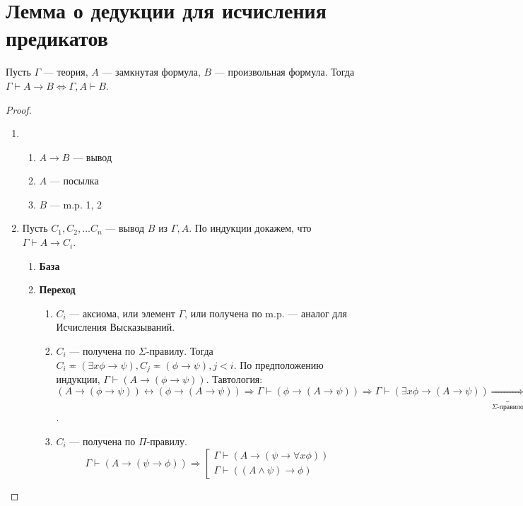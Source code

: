 \section{Лемма о дедукции для исчисления предикатов}
\begin{lemma}[О дедукции]
    Пусть $\Gamma$ --- теория, $A$ --- замкнутая формула, $B$ --- произвольная формула. Тогда $\Gamma \vdash A \rightarrow B \Leftrightarrow \Gamma, A \vdash B$.
\end{lemma}
\begin{proof}\indent
    \begin{enumerate}
        \item[$\Rightarrow$.]\begin{enumerate}
                \item[1.] $A \rightarrow B$ --- вывод
                \item[2.] $A$ --- посылка
                \item[3.] $B$ --- m.p. 1, 2
            \end{enumerate}
        \item[$\Leftarrow$.] Пусть $C_1, C_2, \dots C_n$ --- вывод $B$ из $\Gamma, A$. По индукции докажем, что $\Gamma \vdash A \rightarrow C_i$.
        \begin{enumerate}
            \item[] \textbf{База}
            \item[] \textbf{Переход} \begin{enumerate}
                \item $C_i$ --- аксиома, или элемент $\Gamma$, или получена по m.p. --- аналог для Исчисления Высказываний.
                \item $C_i$ --- получена по $\Sigma$-правилу. Тогда $C_i \eqcirc (\exists x \phi \rightarrow \psi), C_j \eqcirc (\phi \rightarrow \psi), j < i$. По предположению индукции, $\Gamma \vdash (A \rightarrow (\phi \rightarrow \psi))$. Тавтология: $(A \rightarrow (\phi \rightarrow \psi)) \leftrightarrow (\phi \rightarrow (A \rightarrow \psi)) \Rightarrow \Gamma \vdash (\phi \rightarrow (A \rightarrow \psi)) \Rightarrow \Gamma \vdash (\exists x \phi \rightarrow (A \rightarrow \psi)) \underbrace{\Longrightarrow}_{\Sigma\text{-правило}} \Gamma \vdash (A \rightarrow ( \exists x \phi \rightarrow \psi)) \Rightarrow \Gamma \vdash (A \rightarrow C_i)$.
                \item $C_i$ --- получена по $\Pi$-правилу.
                $$\Gamma \vdash (A \rightarrow (\psi \rightarrow \phi)) \Rightarrow \left[\begin{array}{l}
                    \Gamma \vdash (A \rightarrow (\psi \rightarrow \forall x \phi))  \\
                    \Gamma \vdash ((A \wedge \psi) \rightarrow \phi) 
                \end{array}\right.$$
            \end{enumerate}
        \end{enumerate}
    \end{enumerate}    
\end{proof}

